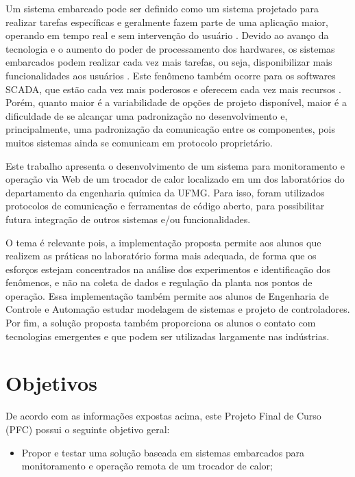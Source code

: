 	Um sistema embarcado pode ser definido como um sistema projetado para realizar tarefas específicas e geralmente fazem parte de uma aplicação maior, operando em tempo real e sem intervenção do usuário \cite{baskiyar2005}.  Devido ao avanço da tecnologia e o aumento do poder de processamento dos hardwares, os sistemas embarcados podem realizar cada vez mais tarefas, ou seja, disponibilizar mais funcionalidades aos usuários \cite{luiz2011}. Este fenômeno também ocorre para os softwares SCADA, que estão cada vez mais poderosos e oferecem cada vez mais recursos \cite{david2017}. Porém, quanto maior é a variabilidade de opções de projeto disponível, maior é a dificuldade de se alcançar uma padronização no desenvolvimento e, principalmente, uma padronização da comunicação entre os componentes, pois muitos sistemas ainda se comunicam em protocolo proprietário.
	
	Este trabalho apresenta o desenvolvimento de um sistema para monitoramento e operação via Web de um trocador de calor localizado em um dos laboratórios do departamento da engenharia química da UFMG. Para isso, foram utilizados protocolos de comunicação e ferramentas de código aberto, para possibilitar futura integração de outros sistemas e/ou funcionalidades.
	
	O tema é relevante pois, a implementação proposta permite aos alunos que realizem as práticas no laboratório forma mais adequada, de forma que os esforços estejam concentrados na análise dos experimentos e identificação dos fenômenos, e não na coleta de dados e regulação da planta nos pontos de operação. Essa implementação também permite aos alunos de Engenharia de Controle e Automação estudar modelagem de sistemas e projeto de controladores. Por fim, a solução proposta também proporciona os alunos o contato com tecnologias emergentes e que podem ser utilizadas largamente nas indústrias.  
	
		
	
\section{Objetivos}
	De acordo com as informações expostas acima, este Projeto Final de Curso (PFC) possui o seguinte objetivo geral:
	
	\begin{itemize}
		\item 
		Propor e testar uma solução baseada em sistemas embarcados para monitoramento e operação remota de um trocador de calor;
	\end{itemize}
	
